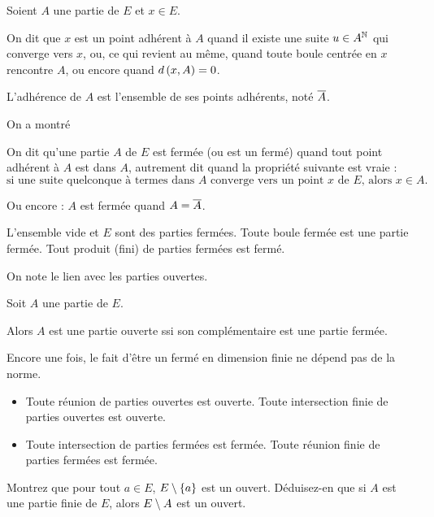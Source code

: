 \begin{defi}
Soient \(A\) une partie de \(E\) et \(x\in E\).

On dit que \(x\) est un point adhérent à \(A\) quand il existe une suite \(u\in A^{\mathbb{N}}\) qui converge vers \(x\), ou, ce qui revient au même, quand toute boule centrée en \(x\) rencontre \(A\), ou encore quand \(d\left(x,A\right)=0\).

L'adhérence de \(A\) est l'ensemble de ses points adhérents, noté \(\overline{A}\).
\end{defi}

On a montré

\begin{defi}
On dit qu'une partie \(A\) de \(E\) est fermée (ou est un fermé) quand tout point adhérent à \(A\) est dans \(A\), autrement dit quand la propriété suivante est vraie : \[\text{si une suite quelconque à termes dans }A\text{ converge vers un point }x\text{ de }E\text{, alors }x\in A.\]

Ou encore : \(A\) est fermée quand \(A=\overline{A}\).
\end{defi}

\begin{prop}
L'ensemble vide et \(E\) sont des parties fermées. Toute boule fermée est une partie fermée. Tout produit (fini) de parties fermées est fermé.
\end{prop}

On note le lien avec les parties ouvertes.

\begin{prop}
Soit \(A\) une partie de \(E\).

Alors \(A\) est une partie ouverte ssi son complémentaire est une partie fermée.
\end{prop}

Encore une fois, le fait d'être un fermé en dimension finie ne dépend pas de la norme.

\begin{prop}
\begin{itemize}
    \item Toute réunion de parties ouvertes est ouverte. Toute intersection finie de parties ouvertes est ouverte. \\
    \item Toute intersection de parties fermées est fermée. Toute réunion finie de parties fermées est fermée.
\end{itemize}
\end{prop}

\begin{exo}
Montrez que pour tout \(a\in E\), \(E\setminus\left\lbrace a\right\rbrace\) est un ouvert. Déduisez-en que si \(A\) est une partie finie de \(E\), alors \(E\setminus A\) est un ouvert.
\end{exo}

